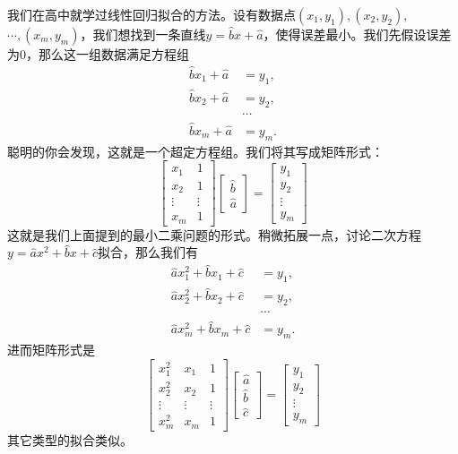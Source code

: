 \documentclass[a4paper, 12pt]{article}
\begin{document}
    我们在高中就学过线性回归拟合的方法。设有数据点$(x_1,y_1),(x_2,y_2),$ $\cdots,(x_m,y_m)$，我们想找到一条直线$y=\hat bx+\hat a$，使得误差最小。我们先假设误差为0，那么这一组数据满足方程组
    \begin{align*}
        \hat bx_1+\hat a&=y_1,\\
        \hat bx_2+\hat a&=y_2,\\
        &\cdots\\
        \hat bx_m+\hat a&=y_m.
    \end{align*}
    聪明的你会发现，这就是一个超定方程组。我们将其写成矩阵形式：
    \[
    \begin{bmatrix}
        x_1 & 1 \\
        x_2 & 1 \\
        \vdots & \vdots \\
        x_m & 1
    \end{bmatrix}
    \begin{bmatrix}
        \hat b \\ \hat a
    \end{bmatrix}
    =
    \begin{bmatrix}
        y_1 \\ y_2 \\ \vdots \\ y_m
    \end{bmatrix}
    \]
    这就是我们上面提到的最小二乘问题的形式。稍微拓展一点，讨论二次方程$y=\hat a x^2+\hat b x+\hat c$拟合，那么我们有
    \begin{align*}
        \hat a x_1^2 + \hat b x_1 + \hat c &= y_1,\\
        \hat a x_2^2 + \hat b x_2 + \hat c &= y_2,\\
        &\cdots\\
        \hat a x_m^2 + \hat b x_m + \hat c &= y_m.
    \end{align*}
    进而矩阵形式是
    \[
    \begin{bmatrix}
        x_1^2 & x_1 & 1 \\
        x_2^2 & x_2 & 1 \\
        \vdots & \vdots & \vdots \\
        x_m^2 & x_m & 1
    \end{bmatrix}
    \begin{bmatrix}
        \hat a \\ \hat b \\ \hat c
    \end{bmatrix}
    =
    \begin{bmatrix}
        y_1 \\ y_2 \\ \vdots \\ y_m
    \end{bmatrix}
    \]
    其它类型的拟合类似。
\end{document}
